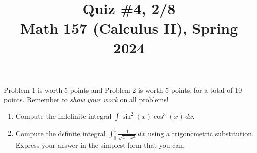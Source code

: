 \documentclass[11pt]{article}
\title{Quiz \#4, 2/8 \\ Math 157 (Calculus II), Spring 2024}
\date{}
\begin{document}
\maketitle

\thispagestyle{empty}

\vspace{-2cm}

Problem 1 is worth 5 points and Problem 2 is worth 5 points, for a total of 10 points. Remember to \emph{show your work} on all problems!

\begin{enumerate}
\item Compute the indefinite integral $\displaystyle \int \sin^2(x) \cos^3(x) \, dx$.

\vspace{8cm}

\item Compute the definite integral $\displaystyle \int_{0}^{1} \frac{1}{\sqrt{4-x^2}} \, dx$ using a trigonometric substitution. \\ Express your answer in the simplest form that you can.

\end{enumerate}
\end{document}
